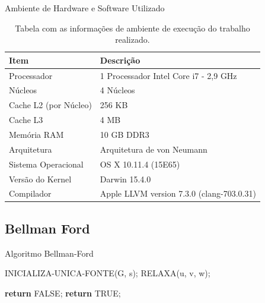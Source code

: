 \documentclass[aspectratio=169]{beamer}
\begin{document}
	\begin{frame}{Ambiente de Hardware e Software Utilizado}
		\begin{table}[H]
			\caption{Tabela com as informações de ambiente de execução do trabalho realizado.}
			\centering
			\begin{tabular}{l|l}
				\hline
				\textbf{Item}                & \textbf{Descrição} \\ \hline \hline
				Processador         & 1 Processador Intel Core i7 - 2,9 GHz         \\
				Núcleos             & 4 Núcleos \\
				Cache L2 (por Núcleo) & 256 KB \\
				Cache L3            & 4 MB \\
				Memória RAM         & 10 GB DDR3        \\
				Arquitetura         & Arquitetura de von Neumann         \\
				Sistema Operacional & OS X 10.11.4 (15E65)         \\
				Versão do Kernel    & Darwin 15.4.0 \\
				Compilador          & Apple LLVM version 7.3.0 (clang-703.0.31)         \\\hline
			\end{tabular}
		\end{table}
	\end{frame}
	
\subsection{Bellman Ford}
	\begin{frame}{Algoritmo Bellman-Ford}
		\begin{algorithm}[H]
			\caption{Bellman-Ford}\label{alg:d}
			\begin{algorithmic}[1]
				\State INICIALIZA-UNICA-FONTE(G, s);
				\State RELAXA(u, v, w);  
				\EndFor
				\EndFor
				
				\State \textbf{return} FALSE;
				\EndIf
				\EndFor
				\State \textbf{return} TRUE;
				\EndProcedure
			\end{algorithmic}
		\end{algorithm}
	\end{frame}
	
\end{document}
